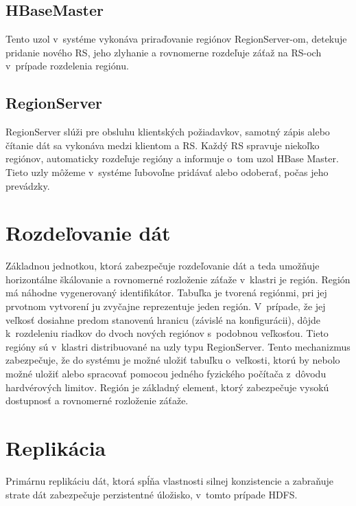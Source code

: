 \documentclass[11pt,twoside,a4paper]{book}
\begin{document}

\subsection*{HBaseMaster}

Tento uzol v~systéme vykonáva priraďovanie regiónov RegionServer-om, detekuje pridanie nového RS, jeho zlyhanie a rovnomerne rozdeľuje záťaž na RS-och v~prípade rozdelenia regiónu.

\subsection*{RegionServer}

RegionServer slúži pre obsluhu klientských požiadavkov, samotný zápis alebo čítanie dát sa vykonáva medzi klientom a RS. Každý RS spravuje niekoľko regiónov, automaticky rozdeľuje regióny a informuje o~tom uzol HBase Master. Tieto uzly môžeme v~systéme ľubovoľne pridávať alebo odoberať, počas jeho prevádzky.


\section{Rozdeľovanie dát}

Základnou jednotkou, ktorá zabezpečuje rozdeľovanie dát a teda umožňuje horizontálne škálovanie a rovnomerné rozloženie záťaže v~klastri je región. Región má náhodne vygenerovaný identifikátor. Tabuľka je tvorená regiónmi, pri jej prvotnom vytvorení ju zvyčajne reprezentuje jeden región. V~prípade, že jej veľkosť dosiahne predom stanovenú hranicu (závislé na konfigurácii), dôjde k~rozdeleniu riadkov do dvoch nových regiónov s~podobnou veľkosťou. Tieto regióny sú  v~klastri distribuované na uzly typu RegionServer. Tento mechanizmus zabezpečuje, že do systému je možné uložiť tabuľku o~veľkosti, ktorú by nebolo možné uložiť alebo spracovať pomocou jedného fyzického počítača z~dôvodu hardvérových limitov. Región je základný element, ktorý zabezpečuje vysokú dostupnosť a rovnomerné rozloženie záťaže.

\section{Replikácia}
Primárnu replikáciu dát, ktorá spĺňa vlastnosti silnej konzistencie a zabraňuje strate dát zabezpečuje perzistentné úložisko, v~tomto prípade HDFS.
\end{document}
